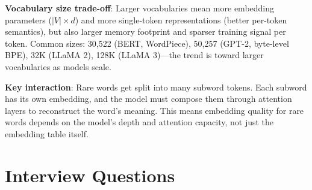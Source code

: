 \textbf{Vocabulary size trade-off}: Larger vocabularies mean more embedding parameters ($|V| \times d$) and more single-token representations (better per-token semantics), but also larger memory footprint and sparser training signal per token. Common sizes: 30,522 (BERT, WordPiece), 50,257 (GPT-2, byte-level BPE), 32K (LLaMA 2), 128K (LLaMA 3)---the trend is toward larger vocabularies as models scale.

\textbf{Key interaction}: Rare words get split into many subword tokens. Each subword has its own embedding, and the model must compose them through attention layers to reconstruct the word's meaning. This means embedding quality for rare words depends on the model's depth and attention capacity, not just the embedding table itself.

\section{Interview Questions}
\label{sec:embedding_questions}


